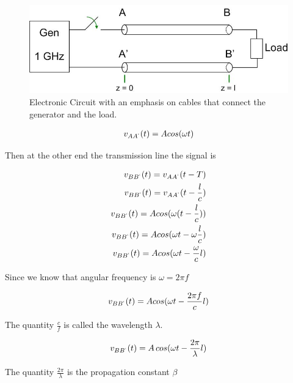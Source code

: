 \documentclass{ximera}
\begin{document}
\begin{figure}[htbp]
\begin{center}
\includegraphics[scale=0.5]{../jpg/generaltransmissionlinecircuit1.jpg}
\end{center}
\caption{Electronic Circuit with an emphasis on cables that connect the generator and the load.}
\label{elcric}
\end{figure}



\begin{eqnarray}
v_{AA^`}(t)=A cos(\omega t)
\end{eqnarray}

Then at the other end the transmission line the signal is


\begin{eqnarray}
v_{BB^`}(t)=v_{AA^`}(t-T) \\
v_{BB^`}(t)=v_{AA^`}(t-\frac{l}{c}) \\
v_{BB^`}(t)=A cos(\omega (t - \frac{l}{c}))  \\
v_{BB^`}(t)=A cos(\omega t - \omega \frac{l}{c}) \\
v_{BB^`}(t)=A cos(\omega t -  \frac{\omega }{c} l) 
\end{eqnarray}

Since we know that angular frequency is  $\omega = 2 \pi f$


\begin{eqnarray}
v_{BB^`}(t)=A cos(\omega t -  \frac{ 2 \pi f }{c} l)
\end{eqnarray}

The quantity $\frac{c}{f}$ is called the wavelength $\lambda$. 

\begin{eqnarray}
v_{BB^`}(t)=A \, cos(\omega t -  \frac{ 2 \pi }{\lambda} l) \label{tllength1}
\end{eqnarray}

The quantity $ \frac{ 2 \pi }{\lambda} $ is the propagation constant $\beta$
\end{document}
